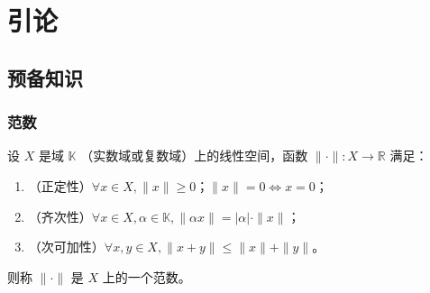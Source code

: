 \documentclass[cn,mtpro2,12pt]{elegantbook}
\title{}
\author{龚梓阳}
\date{\zhtoday}
\begin{document}
\frontmatter
\maketitle
\tableofcontents

\mainmatter
\chapter{引论}

\section{预备知识}

\subsection{范数}

\begin{definition}[范数]
    设 $X$ 是域 $\mathbb{K}$ （实数域或复数域）上的线性空间，函数 $\|\cdot\|:X\rightarrow\mathbb{R}$ 满足：
    \begin{enumerate}
        \item （正定性）$\forall x\in X, \|x\|\geq0$；$\|x\|=0\iff x=0$；
        \item （齐次性）$\forall x\in X, \alpha\in\mathbb{K}, \|\alpha x\|=|\alpha|\cdot\|x\|$；
        \item （次可加性）$\forall x,y\in X, \|x+y\|\leq\|x\|+\|y\|$。
    \end{enumerate}
    则称 $\|\cdot\|$ 是 $X$ 上的一个范数。
\end{definition}
\end{document}
